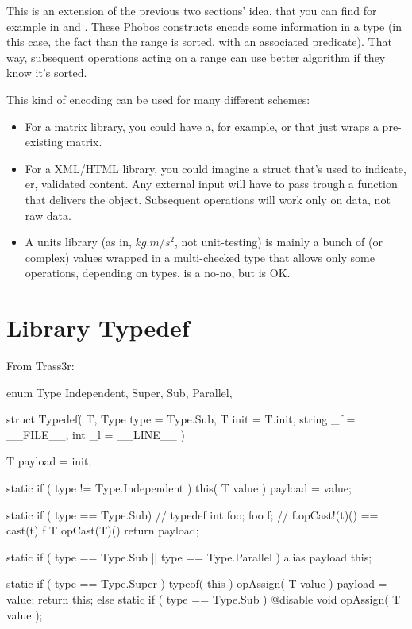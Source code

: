 This is an extension of the previous two sections' idea, that you can find for example in  and . These Phobos constructs encode some information in a type (in this case, the fact than the range is sorted, with an associated predicate). That way, subsequent operations acting on a range can use better algorithm if they know it's sorted.

This kind of encoding can be used for many different schemes:

\begin{itemize}
\item For a matrix library, you could have a, for example,  or  that just wraps a pre-existing matrix.
\item For a XML/HTML library, you could imagine a  struct that's used to indicate, er, validated content. Any external input will have to pass trough a  function that delivers the  object. Subsequent operations will work only on  data, not raw data.
\item A units library (as in, $kg.m/s^{2}$, not unit-testing) is mainly a bunch of  (or complex) values wrapped in a multi-checked type that allows only some operations, depending on types.  is a no-no, but  is OK.
\end{itemize}

\section{Library Typedef}\label{typedef}

From Trass3r:


\begin{dcode}
enum Type
{
    Independent,
    Super,
    Sub,
    Parallel,
}

struct Typedef( T, 
                Type type = Type.Sub, 
                T init = T.init, 
                string _f = __FILE__,
                int _l = __LINE__ )
{
    T payload = init;

    static if ( type != Type.Independent )
        this( T value )
        {
            payload = value;
        }

    static if ( type == Type.Sub)
        // typedef int foo; foo f;
        // f.opCast!(t)() == cast(t) f
        T opCast(T)()
        {
            return payload;
        }

    static if ( type == Type.Sub || type == Type.Parallel )
        alias payload this;

    static if ( type == Type.Super )
        typeof( this ) opAssign( T value )
        {
            payload = value;
            return this;
        }
    else static if ( type == Type.Sub )
        @disable void opAssign( T value );
}
\end{dcode}
